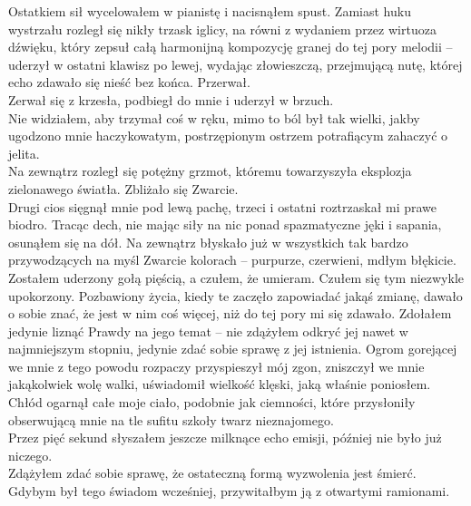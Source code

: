 \documentclass[../MAIN.tex]{subfiles}
\begin{document}
Ostatkiem sił wycelowałem w pianistę i nacisnąłem spust. Zamiast huku wystrzału rozległ się nikły trzask iglicy, na równi z wydaniem przez wirtuoza dźwięku, który zepsuł całą harmonijną kompozycję granej do tej pory melodii -- uderzył w ostatni klawisz po lewej, wydając złowieszczą, przejmującą nutę, której echo zdawało się nieść bez końca. Przerwał.\\
Zerwał się z krzesła, podbiegł do mnie i uderzył w brzuch.\\
Nie widziałem, aby trzymał coś w ręku, mimo to ból był tak wielki, jakby ugodzono mnie haczykowatym, postrzępionym ostrzem potrafiącym zahaczyć o jelita.\\
Na zewnątrz rozległ się potężny grzmot, któremu towarzyszyła eksplozja zielonawego światła. Zbliżało się Zwarcie.\\
Drugi cios sięgnął mnie pod lewą pachę, trzeci i ostatni roztrzaskał mi prawe biodro. Tracąc dech, nie mając siły na nic ponad spazmatyczne jęki i sapania, osunąłem się na dół. Na zewnątrz błyskało już w wszystkich tak bardzo przywodzących na myśl Zwarcie kolorach -- purpurze, czerwieni, mdłym błękicie. Zostałem uderzony gołą pięścią, a czułem, że umieram. Czułem się tym niezwykle upokorzony. Pozbawiony życia, kiedy te zaczęło zapowiadać jakąś zmianę, dawało o sobie znać, że jest w nim coś więcej, niż do tej pory mi się zdawało. Zdołałem jedynie liznąć Prawdy na jego temat -- nie zdążyłem odkryć jej nawet w najmniejszym stopniu, jedynie zdać sobie sprawę z jej istnienia. Ogrom gorejącej we mnie z tego powodu rozpaczy przyspieszył mój zgon, zniszczył we mnie jakąkolwiek wolę walki, uświadomił wielkość klęski, jaką właśnie poniosłem. Chłód ogarnął całe moje ciało, podobnie jak ciemności, które przysłoniły obserwującą mnie na tle sufitu szkoły twarz nieznajomego.\\
Przez pięć sekund słyszałem jeszcze milknące echo emisji, później nie było już niczego.\\
Zdążyłem zdać sobie sprawę, że ostateczną formą wyzwolenia jest śmierć. Gdybym był tego świadom wcześniej, przywitałbym ją z otwartymi ramionami.\\
\end{document}
